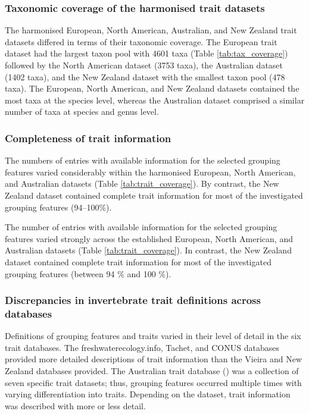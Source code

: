 \documentclass[12pt]{article}
\begin{document}
\subsubsection*{Taxonomic coverage of the harmonised trait datasets}

The harmonised European, North American, Australian, and New Zealand trait datasets differed in terms of their taxonomic coverage. The European trait dataset had the largest taxon pool with 4601 taxa (Table \ref{tab:tax_coverage}) followed by the North American dataset (3753 taxa), the Australian dataset (1402 taxa), and the New Zealand dataset with the smallest taxon pool (478 taxa). The European, North American, and New Zealand datasets contained the most taxa at the species level, whereas the Australian dataset comprised a similar number of taxa at species and genus level.


\subsubsection*{Completeness of trait information}

The numbers of entries with available information for the selected grouping features varied considerably within the harmonised European, North American, and Australian datasets (Table \ref{tab:trait_coverage}). By contrast, the New Zealand dataset contained complete trait information for most of the investigated grouping features (94–100\%).

The number of entries with available information for the selected grouping features varied strongly across the established European, North American, and Australian datasets (Table \ref{tab:trait_coverage}). In contrast, the New Zealand dataset contained complete trait information for most of the investigated grouping features (between 94 \% and 100 \%).


\subsubsection*{Discrepancies in invertebrate trait definitions across databases}

Definitions of grouping features and traits varied in their level of detail in the six trait databases. The freshwaterecology.info, Tachet, and CONUS databases provided more detailed descriptions of trait information than the Vieira and New Zealand databases provided. The Australian trait database (\cite{kefford_integrated_2020}) was a collection of seven specific trait datasets; thus, grouping features occurred multiple times with varying differentiation into traits. Depending on the dataset, trait information was described with more or less detail.
\end{document}
